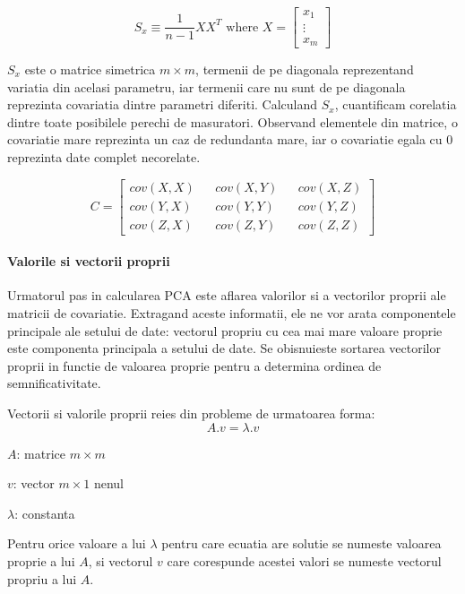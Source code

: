 \documentclass[12pt,oneside]{article}
\begin{document}
\begin{equation}
S_x \equiv \frac{1}{n-1}XX^T \text { where } X = 
\begin{bmatrix}
x_1 \\ \vdots \\ x_m
\end{bmatrix}
\end{equation}

$S_x$ este o matrice simetrica $m \times m$, termenii de pe diagonala reprezentand variatia din acelasi parametru, iar termenii care nu sunt de pe diagonala reprezinta covariatia dintre parametri diferiti. Calculand $S_x$, cuantificam corelatia dintre toate posibilele perechi de masuratori. Observand elementele din matrice, o covariatie mare reprezinta un caz de redundanta mare, iar o covariatie egala cu 0 reprezinta date complet necorelate.

\begin{equation}
C=\begin{bmatrix}
cov(X,X) && cov(X,Y) && cov(X,Z) \\
cov(Y,X) && cov(Y,Y) && cov(Y,Z) \\
cov(Z,X) && cov(Z,Y) && cov(Z,Z)
\end{bmatrix}
\end{equation}


\paragraph{Valorile si vectorii proprii}
Urmatorul pas in calcularea PCA este aflarea valorilor si a vectorilor proprii ale matricii de covariatie. Extragand aceste informatii, ele ne vor arata componentele principale ale setului de date: vectorul propriu cu cea mai mare valoare proprie este componenta principala a setului de date. Se obisnuieste sortarea vectorilor proprii in functie de valoarea proprie pentru a determina ordinea de semnificativitate.

Vectorii si valorile proprii reies din probleme de urmatoarea forma:
\begin{equation}
A.v= \lambda . v
\end{equation}

\textbf{$A$}: matrice $m \times m$


\textbf{$v$}: vector $m \times 1$  nenul


$\lambda$: constanta

Pentru orice valoare a lui $\lambda$ pentru care ecuatia are solutie se numeste valoarea proprie a lui $A$, si vectorul $v$ care corespunde acestei valori se numeste vectorul propriu a lui $A$. 
\end{document}

